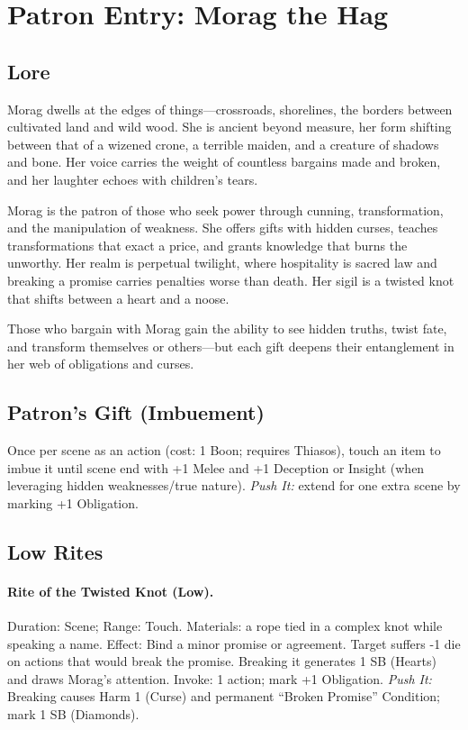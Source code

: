 \section{Patron Entry: Morag the Hag}
\label{patron:morag}

\subsection*{Lore}
Morag dwells at the edges of things---crossroads, shorelines, the borders between cultivated land and wild wood. She is ancient beyond measure, her form shifting between that of a wizened crone, a terrible maiden, and a creature of shadows and bone. Her voice carries the weight of countless bargains made and broken, and her laughter echoes with children's tears.  

Morag is the patron of those who seek power through cunning, transformation, and the manipulation of weakness. She offers gifts with hidden curses, teaches transformations that exact a price, and grants knowledge that burns the unworthy. Her realm is perpetual twilight, where hospitality is sacred law and breaking a promise carries penalties worse than death. Her sigil is a twisted knot that shifts between a heart and a noose.  

Those who bargain with Morag gain the ability to see hidden truths, twist fate, and transform themselves or others---but each gift deepens their entanglement in her web of obligations and curses.

\subsection*{Patron's Gift (Imbuement)}
Once per scene as an action (cost: 1 Boon; requires Thiasos), touch an item to imbue it until scene end with +1 Melee and +1 Deception or Insight (when leveraging hidden weaknesses/true nature). \emph{Push It:} extend for one extra scene by marking +1 Obligation.

\subsection*{Low Rites}
\paragraph{Rite of the Twisted Knot (Low).} Duration: Scene; Range: Touch.  
Materials: a rope tied in a complex knot while speaking a name.  
Effect: Bind a minor promise or agreement. Target suffers -1 die on actions that would break the promise. Breaking it generates 1 SB (Hearts) and draws Morag's attention.  
Invoke: 1 action; mark +1 Obligation.  
\emph{Push It:} Breaking causes Harm 1 (Curse) and permanent ``Broken Promise'' Condition; mark 1 SB (Diamonds).  

